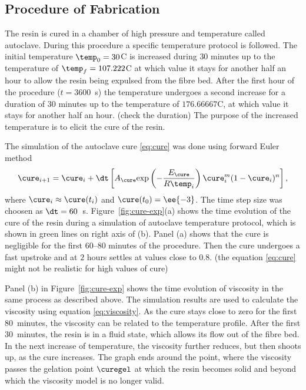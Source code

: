 \documentclass[twoside,a4paper,12pt]{article}
\newcommand{\figref}[1]{Figure~\ref{#1}}
\newcommand{\note}[1]{{\color{red}(#1)}}
\begin{document}
\subsection{Procedure of Fabrication}

The resin is cured in a chamber of high pressure and temperature
called autoclave. During this procedure a specific temperature
protocol is followed.  The initial temperature $\temp_0 = 30$\degree C is
increased during $30$ minutes up to the temperature of
$\temp_f = 107.222$\degree C at which value it stays for another half an
hour to allow the resin being expulsed from the fibre bed. After the
first hour of the procedure ($t=3600$~s) the temperature undergoes a
second increase for a duration of $30$ minutes up to the temperature
of $176.66667$\degree C, at which value it stays for another half an
hour. \note{check the duration} The purpose of the increased
temperature is to elicit the cure of the resin.

The simulation of the autoclave cure \eqref{eq:cure} was done using
forward Euler method
%
\begin{align}
  \cure_{i+1} =    \cure_i + \dt \left[A_\cure \exp{-\frac{E_\cure }{R\temp_i}} \cure_i^m (1-\cure_i)^n\right], \label{eq:cure-fe}
\end{align}
%
where $\cure_i \approx \cure(t_i)$ and $\cure(t_0)=\ee{-3}$. The
time step size was choosen as $\dt = 60$~s.
%
\figref{fig:cure-exp}(a) shows the time evolution of the cure of the
resin during a simulation of autoclave temperature protocol, which is
shown in green lines on right axis of (b).  Panel (a) shows that the
cure is negligible for the first $60$--$80$ minutes of the
procedure. Then the cure undergoes a fast upstroke and at $2$ hours
settles at values close to $0.8$.
%
\note{the equation \eqref{eq:cure} might not be realistic for high values of cure}

Panel (b) in \figref{fig:cure-exp} shows the time evolution of
viscosity in the same process as described above. The simulation
results are used to calculate the viscosity using equation
\eqref{eq:viscosity}. As the cure stays close to zero for the first
$80$~minutes, the viscosity can be related to the temperature
profile. After the first $30$~minutes, the resin is in a fluid state,
which allows its flow out of the fibre bed. In the next increase of
temperature, the viscosity further reduces, but then shoots up, as the
cure increases. The graph ends around the point, where the viscosity
passes the gelation point $\curegel$ at which the resin becomes solid
and beyond which the viscosity model is no longer valid.
\end{document}

